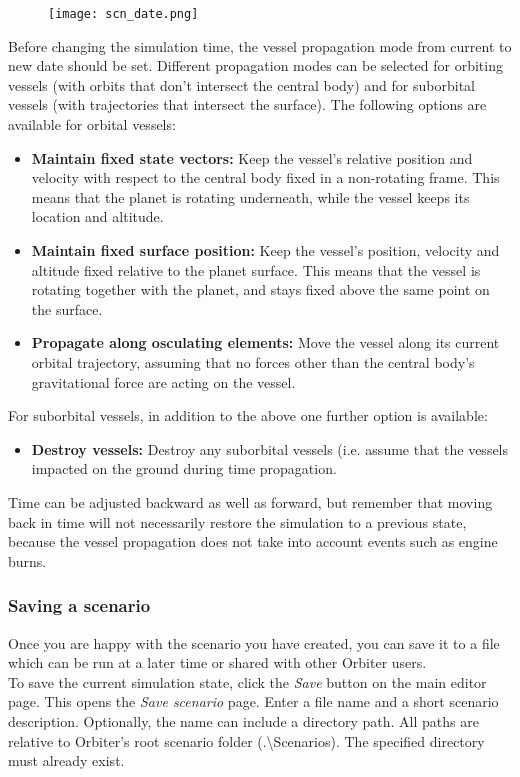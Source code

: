 \documentclass[Orbiter User Manual.tex]{subfiles}
\begin{document}
\begin{figure}[H]
	\centering
	\texttt{[image: scn\_date.png]}
\end{figure}

\noindent
Before changing the simulation time, the vessel propagation mode from current to new date should be set. Different propagation modes can be selected for orbiting vessels (with orbits that don't intersect the central body) and for suborbital vessels (with trajectories that intersect the surface). The following options are available for orbital vessels:

\begin{itemize}
\item \textbf{Maintain fixed state vectors:} Keep the vessel's relative position and velocity with respect to the central body fixed in a non-rotating frame. This means that the planet is rotating underneath, while the vessel keeps its location and altitude.
\item \textbf{Maintain fixed surface position:} Keep the vessel's position, velocity and altitude fixed relative to the planet surface. This means that the vessel is rotating together with the planet, and stays fixed above the same point on the surface.
\item \textbf{Propagate along osculating elements:} Move the vessel along its current orbital trajectory, assuming that no forces other than the central body's gravitational force are acting on the vessel.
\end{itemize}

\noindent
For suborbital vessels, in addition to the above one further option is available:

\begin{itemize}
\item \textbf{Destroy vessels:} Destroy any suborbital vessels (i.e. assume that the vessels impacted on the ground during time propagation.
\end{itemize}

\noindent
Time can be adjusted backward as well as forward, but remember that moving back in time will not necessarily restore the simulation to a previous state, because the vessel propagation does not take into account events such as engine burns.

\subsubsection{Saving a scenario}
Once you are happy with the scenario you have created, you can save it to a file which can be run at a later time or shared with other Orbiter users.\\
To save the current simulation state, click the \textit{Save} button on the main editor page. This opens the \textit{Save scenario} page. Enter a file name and a short scenario description. Optionally, the name can include a directory path. All paths are relative to Orbiter's root scenario folder (.\textbackslash Scenarios). The specified directory must already exist.
\end{document}
